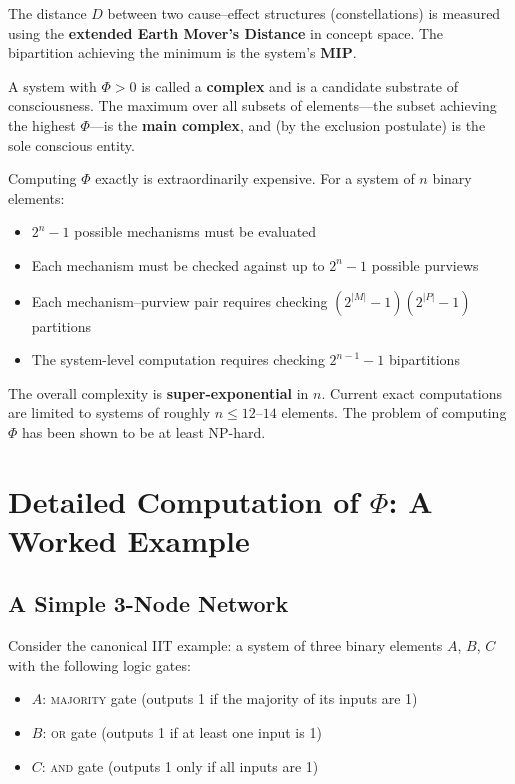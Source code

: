 \documentclass[11pt,a4paper]{report}
\newcommand{\Phi}{\varPhi}
\begin{document}
The distance $D$ between two cause--effect structures (constellations) is measured using the \textbf{extended Earth Mover's Distance} in concept space. The bipartition achieving the minimum is the system's \textbf{MIP}.

A system with $\Phi > 0$ is called a \textbf{complex} and is a candidate substrate of consciousness. The maximum over all subsets of elements---the subset achieving the highest $\Phi$---is the \textbf{main complex}, and (by the exclusion postulate) is the sole conscious entity.

\begin{notebox}
Computing $\Phi$ exactly is extraordinarily expensive. For a system of $n$ binary elements:
\begin{itemize}[leftmargin=1.5em]
  \item $2^n - 1$ possible mechanisms must be evaluated
  \item Each mechanism must be checked against up to $2^n - 1$ possible purviews
  \item Each mechanism--purview pair requires checking $(2^{|M|} - 1)(2^{|P|} - 1)$ partitions
  \item The system-level computation requires checking $2^{n-1} - 1$ bipartitions
\end{itemize}
The overall complexity is \textbf{super-exponential} in $n$. Current exact computations are limited to systems of roughly $n \leq 12$--$14$ elements. The problem of computing $\Phi$ has been shown to be at least NP-hard.
\end{notebox}


\chapter{Detailed Computation of $\Phi$: A Worked Example}

\section{A Simple 3-Node Network}

Consider the canonical IIT example: a system of three binary elements $A$, $B$, $C$ with the following logic gates:
\begin{itemize}[leftmargin=1.5em]
  \item $A$: \textsc{majority} gate (outputs 1 if the majority of its inputs are 1)
  \item $B$: \textsc{or} gate (outputs 1 if at least one input is 1)
  \item $C$: \textsc{and} gate (outputs 1 only if all inputs are 1)
\end{itemize}
\end{document}
